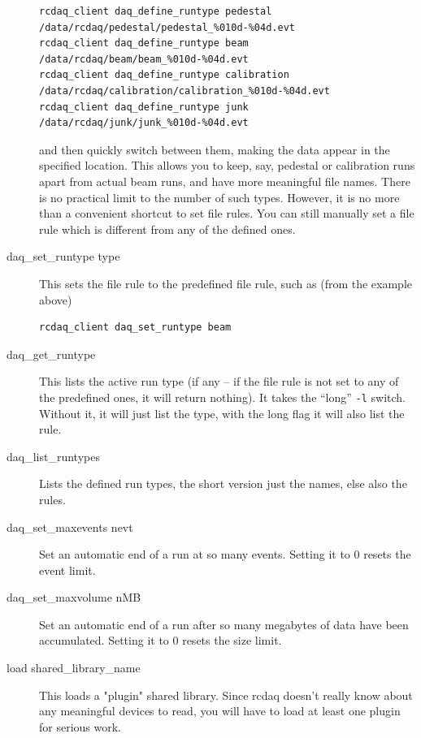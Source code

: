 \documentclass{article}[11pt]
\begin{document}
\begin{description}
\begin{verbatim}
rcdaq_client daq_define_runtype pedestal     /data/rcdaq/pedestal/pedestal_%010d-%04d.evt
rcdaq_client daq_define_runtype beam         /data/rcdaq/beam/beam_%010d-%04d.evt
rcdaq_client daq_define_runtype calibration  /data/rcdaq/calibration/calibration_%010d-%04d.evt
rcdaq_client daq_define_runtype junk         /data/rcdaq/junk/junk_%010d-%04d.evt
\end{verbatim}

and then quickly switch between them, making the data appear in the
specified location. This allows you to keep, say, pedestal or
calibration runs apart from actual beam runs, and have more meaningful
file names.  There is no practical limit to the number of such
types. However, it is no more than a convenient shortcut to set file
rules. You can still manually set a file rule which is different from
any of the defined ones.

\item[daq\_set\_runtype type] This sets the file rule to the
  predefined file rule, such as (from the example above)

\begin{verbatim}
rcdaq_client daq_set_runtype beam
\end{verbatim}
 
\item[daq\_get\_runtype] This lists the active run type (if any
  -- if the file rule is not set to any of the predefined ones, it
  will return nothing). It takes the ``long'' \verb|-l|
  switch. Without it, it will just list the type, with the long flag
  it will also list the rule.

\item[daq\_list\_runtypes]  Lists the defined run types,
  the short version just the names, else also the rules.

\item[daq\_set\_maxevents nevt] Set an automatic end of a run at
  so many events. Setting it to 0 resets the event limit.

\item[daq\_set\_maxvolume nMB] Set an automatic end of a run
  after so many megabytes of data have been accumulated. Setting it to
  0 resets the size limit.

\item[load shared\_library\_name] This loads a "plugin" shared
  library. Since rcdaq doesn't really know about any meaningful
  devices to read, you will have to load at least one plugin for
  serious work.


\end{description}
\end{document}
